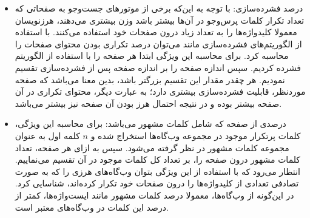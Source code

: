 \documentclass[twoside, a4paper,11pt]{book}
\numberwithin{equation}{chapter}
\numberwithin{table}{chapter}
\numberwithin{figure}{chapter}
\numberwithin{equation}{chapter}
\begin{document}
\begin{itemize}
\item
درصد فشرده‌سازی: با توجه به این‌که برخی از موتورهای جست‌و‌جو به صفحاتی که تعداد تکرار کلمات پرس‌وجو در آن‌ها بیشتر باشد وزن بیشتری می‌دهند، هرزنویسان معمولا کلیدواژه‌ها را به تعداد زیاد درون صفحات خود استفاده می‌کنند. با استفاده از الگوریتم‌های فشرده‌سازی مانند  \cite{Gzip} می‌توان درصد تکراری بودن محتوای صفحات را محاسبه کرد. برای محاسبه این ویژگی ابتدا هر صفحه را با استفاده از الگوریتم  فشرده کردیم. سپس اندازه صفحه را بر اندازه صفحه پس از فشرده‌سازی تقسیم نمودیم. هر چقدر مقدار این تقسیم بزرگتر باشد، بدین معنا می‌باشد که صفحه موردنظر، قابلیت فشرده‌سازی بیشتری دارد؛ به عبارت دیگر، محتوای تکراری در آن صفحه بیشتر بوده و در نتیجه احتمال هرز بودن آن صفحه نیز بیشتر می‌باشد.
\item
درصدی از صفحه که شامل کلمات مشهور می‌باشد: برای محاسبه این ویژگی، کلمات پرتکرار موجود در مجموعه وب‌گاه‌ها استخراج شده و $n$ کلمه اول به عنوان مجموعه کلمات مشهور در نظر گرفته می‌شود. سپس به ازای هر صفحه، تعداد کلمات مشهور درون صفحه را، بر تعداد کل کلمات موجود در آن تقسیم می‌نماییم. انتظار می‌رود که با استفاده از این ویژگی بتوان وب‌گاه‌های هرزی را که به صورت تصادفی تعدادی از کلیدواژه‌ها را درون صفحات خود تکرار کرده‌اند، شناسایی کرد. در این‌گونه از وب‌گاه‌ها، معمولا درصد کلمات مشهور مانند ایست‌واژ‌ه‌ها، کمتر از درصد این کلمات در وب‌گاه‌های معتبر است.

\end{itemize}
\end{document}
